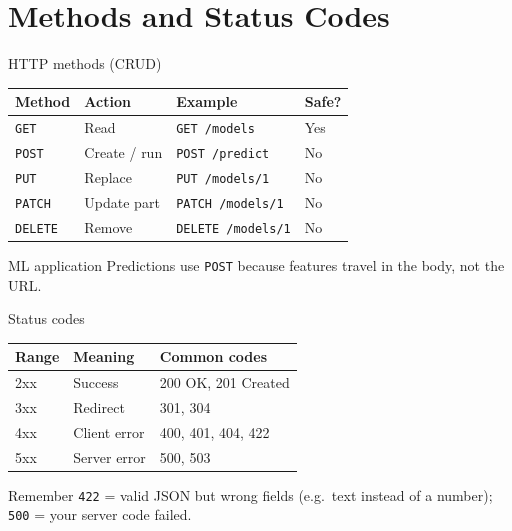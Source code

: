 \documentclass[aspectratio=169,10pt]{beamer}
\begin{document}
\section{Methods and Status Codes}

\begin{frame}{HTTP methods (CRUD)}
\begin{center}
\begin{tabular}{llll}
\toprule
\textbf{Method} & \textbf{Action} & \textbf{Example} & \textbf{Safe?} \\
\midrule
\texttt{GET}    & Read    & \texttt{GET /models}       & Yes \\
\texttt{POST}   & Create / run & \texttt{POST /predict} & No \\
\texttt{PUT}    & Replace & \texttt{PUT /models/1}     & No \\
\texttt{PATCH}  & Update part & \texttt{PATCH /models/1} & No \\
\texttt{DELETE} & Remove  & \texttt{DELETE /models/1}  & No \\
\bottomrule
\end{tabular}
\end{center}
\begin{alertblock}{ML application}
Predictions use \texttt{POST} because features travel in the body, not the URL.
\end{alertblock}
\end{frame}

\begin{frame}{Status codes}
\begin{center}
\begin{tabular}{lll}
\toprule
\textbf{Range} & \textbf{Meaning} & \textbf{Common codes} \\
\midrule
\rowcolor{mlgreen!12} 2xx & Success & 200 OK, 201 Created \\
\rowcolor{mlblue!10}  3xx & Redirect & 301, 304 \\
\rowcolor{mlorange!15} 4xx & Client error & 400, 401, 404, 422 \\
\rowcolor{mlred!12}   5xx & Server error & 500, 503 \\
\bottomrule
\end{tabular}
\end{center}
\begin{block}{Remember}
\texttt{422} = valid JSON but wrong fields (e.g.\ text instead of a number); \texttt{500} = your server code failed.
\end{block}
\end{frame}
\end{document}
